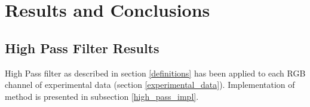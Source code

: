 \documentclass{article}
\begin{document}
\newpage
\section{Results and Conclusions}

%
%

\subsection{High Pass Filter Results}
High Pass filter as described in section \ref{definitions} has been applied to each RGB channel of experimental data (section \ref{experimental_data}). Implementation of method is presented in subsection \ref{high_pass_impl}.
\end{document}
